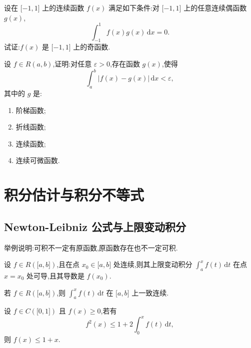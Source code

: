 \documentclass[../数学分析培优讲义.tex]{subfiles}
\begin{document}
\begin{example}
设在 $\lbrack -1,1\rbrack$ 上的连续函数 $f(x)$ 满足如下条件:对 $\lbrack -1,1\rbrack$ 上的任意连续偶函数 $g(x)$,
\[
    \int_{-1}^{1}f(x)g(x)\,\mathrm{d}x=0.
\]
试证:$f(x)$ 是 $\lbrack -1,1\rbrack$ 上的奇函数.
\end{example}
\exampleblank

\begin{example}[特殊函数逼近]
设 $f\in R(a,b)$,证明:对任意 $\varepsilon>0$,存在函数 $g(x)$,使得
\[
    \int_a^b|f(x)-g(x)|\,\mathrm{d}x<\varepsilon,
\]
其中的 $g$ 是:
\begin{enumerate}[label=(\arabic*)]
    \item 阶梯函数;
    \item 折线函数;
    \item 连续函数;
    \item 连续可微函数.
\end{enumerate}
\end{example}
\exampleblank


\newpage

\section{积分估计与积分不等式}


\subsection{Newton-Leibniz 公式与上限变动积分}

\begin{example}
举例说明:可积不一定有原函数,原函数存在也不一定可积.
\end{example}
\exampleblank

\begin{theorem}
设 $f\in R(\lbrack a,b\rbrack)$,且在点 $x_0\in\lbrack a,b\rbrack$ 处连续,则其上限变动积分 $\displaystyle\int_a^x f(t)\,\mathrm{d}t$ 在点 $x=x_0$ 处可导,且其导数是 $f(x_0)$.
\end{theorem}

\begin{theorem}[\markstar]
若 $f\in R(\lbrack a,b\rbrack)$,则 $\displaystyle\int_a^x f(t)\,\mathrm{d}t$ 在 $\lbrack a,b\rbrack$ 上一致连续.
\end{theorem}

\begin{example}
设 $f\in C(\lbrack 0,1\rbrack)$ 且 $f(x)\geq0$,若有
\[
    f^2(x)\leq1+2\int_0^x f(t)\,\mathrm{d}t,
\]
则 $f(x)\leq1+x$.
\end{example}
\exampleblank
\end{document}
